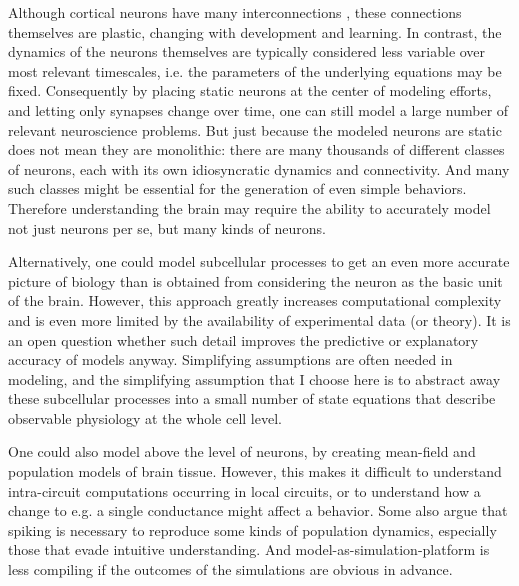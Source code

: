 Although cortical neurons have many interconnections \citep{ball2014rich}, these connections themselves are plastic, changing with development and learning.
In contrast, the dynamics of the neurons themselves are typically considered less variable over most relevant timescales, i.e. the parameters of the underlying equations may be fixed.
Consequently by placing static neurons at the center of modeling efforts, and letting only synapses change over time, one can still model a large number of relevant neuroscience problems.
But just because the modeled neurons are static does not mean they are monolithic: there are many thousands of different classes of neurons, each with its own idiosyncratic dynamics and connectivity.
And many such classes might be essential for the generation of even simple behaviors.
Therefore understanding the brain may require the ability to accurately model not just neurons per se, but many kinds of neurons.

Alternatively, one could model subcellular processes to get an even more accurate picture of biology than is obtained from considering the neuron as the basic unit of the brain.
However, this approach greatly increases computational complexity and is even more limited by the availability of experimental data (or theory). It is an open question whether such detail improves the predictive or explanatory accuracy of models anyway.
Simplifying assumptions are often needed in modeling, and the simplifying assumption that I choose here is to abstract away these subcellular processes into a small number of state equations that describe observable physiology at the whole cell level.

One could also model above the level of neurons, by creating mean-field and population models of brain tissue.
However, this makes it difficult to understand intra-circuit computations occurring in local circuits, or to understand how a change to e.g. a single conductance might affect a behavior.
Some also argue that spiking is necessary to reproduce some kinds of population dynamics, especially those that evade intuitive understanding.
And model-as-simulation-platform is less compiling if the outcomes of the simulations are obvious in advance.

